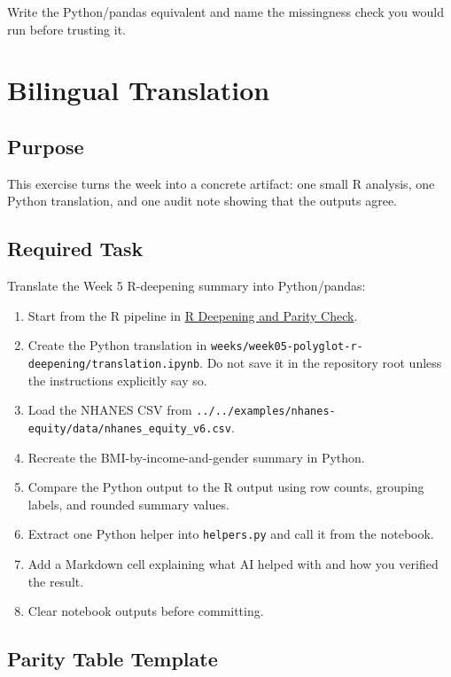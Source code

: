 \documentclass[
  letterpaper,
  DIV=11,
  numbers=noendperiod,
  oneside]{scrreprt}
\providecommand{\tightlist}{%
  \setlength{\itemsep}{0pt}\setlength{\parskip}{0pt}}
\begin{document}
Write the Python/pandas equivalent and name the missingness check you
would run before trusting it.

\chapter{Bilingual Translation}\label{bilingual-translation}

\section{Purpose}\label{purpose-1}

This exercise turns the week into a concrete artifact: one small R
analysis, one Python translation, and one audit note showing that the
outputs agree.

\section{Required Task}\label{required-task}

Translate the Week 5 R-deepening summary into Python/pandas:

\begin{enumerate}
\def\labelenumi{\arabic{enumi}.}
\tightlist
\item
  Start from the R pipeline in \hyperref[r-deepening-and-parity-check]{R
  Deepening and Parity Check}.
\item
  Create the Python translation in
  \texttt{weeks/week05-polyglot-r-deepening/translation.ipynb}. Do not
  save it in the repository root unless the instructions explicitly say
  so.
\item
  Load the NHANES CSV from
  \texttt{../../examples/nhanes-equity/data/nhanes\_equity\_v6.csv}.
\item
  Recreate the BMI-by-income-and-gender summary in Python.
\item
  Compare the Python output to the R output using row counts, grouping
  labels, and rounded summary values.
\item
  Extract one Python helper into \texttt{helpers.py} and call it from
  the notebook.
\item
  Add a Markdown cell explaining what AI helped with and how you
  verified the result.
\item
  Clear notebook outputs before committing.
\end{enumerate}

\section{Parity Table Template}\label{parity-table-template}
\end{document}
